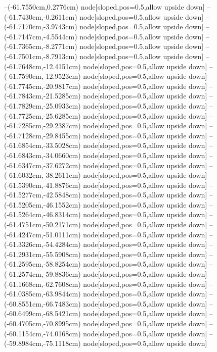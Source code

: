 --(-61.7550cm,0.2776cm) node[sloped,pos=0.5,allow upside down]{\ArrowIn}
--(-61.7430cm,-0.2611cm) node[sloped,pos=0.5,allow upside down]{\arrowIn}
--(-61.7170cm,-3.9743cm) node[sloped,pos=0.5,allow upside down]{\ArrowIn}
--(-61.7147cm,-4.5544cm) node[sloped,pos=0.5,allow upside down]{\arrowIn}
--(-61.7365cm,-8.2771cm) node[sloped,pos=0.5,allow upside down]{\ArrowIn}
--(-61.7501cm,-8.7913cm) node[sloped,pos=0.5,allow upside down]{\arrowIn}
--(-61.7648cm,-12.4151cm) node[sloped,pos=0.5,allow upside down]{\ArrowIn}
--(-61.7590cm,-12.9523cm) node[sloped,pos=0.5,allow upside down]{\arrowIn}
--(-61.7745cm,-20.9817cm) node[sloped,pos=0.5,allow upside down]{\ArrowIn}
--(-61.7843cm,-21.5285cm) node[sloped,pos=0.5,allow upside down]{\arrowIn}
--(-61.7829cm,-25.0933cm) node[sloped,pos=0.5,allow upside down]{\ArrowIn}
--(-61.7725cm,-25.6285cm) node[sloped,pos=0.5,allow upside down]{\arrowIn}
--(-61.7285cm,-29.2387cm) node[sloped,pos=0.5,allow upside down]{\ArrowIn}
--(-61.7128cm,-29.8455cm) node[sloped,pos=0.5,allow upside down]{\arrowIn}
--(-61.6854cm,-33.5028cm) node[sloped,pos=0.5,allow upside down]{\ArrowIn}
--(-61.6843cm,-34.0660cm) node[sloped,pos=0.5,allow upside down]{\arrowIn}
--(-61.6347cm,-37.6272cm) node[sloped,pos=0.5,allow upside down]{\ArrowIn}
--(-61.6032cm,-38.2611cm) node[sloped,pos=0.5,allow upside down]{\arrowIn}
--(-61.5390cm,-41.8876cm) node[sloped,pos=0.5,allow upside down]{\ArrowIn}
--(-61.5277cm,-42.5848cm) node[sloped,pos=0.5,allow upside down]{\arrowIn}
--(-61.5205cm,-46.1552cm) node[sloped,pos=0.5,allow upside down]{\ArrowIn}
--(-61.5264cm,-46.8314cm) node[sloped,pos=0.5,allow upside down]{\arrowIn}
--(-61.4751cm,-50.2171cm) node[sloped,pos=0.5,allow upside down]{\ArrowIn}
--(-61.4247cm,-51.0111cm) node[sloped,pos=0.5,allow upside down]{\arrowIn}
--(-61.3326cm,-54.4284cm) node[sloped,pos=0.5,allow upside down]{\ArrowIn}
--(-61.2931cm,-55.5908cm) node[sloped,pos=0.5,allow upside down]{\ArrowIn}
--(-61.2595cm,-58.8254cm) node[sloped,pos=0.5,allow upside down]{\ArrowIn}
--(-61.2574cm,-59.8836cm) node[sloped,pos=0.5,allow upside down]{\ArrowIn}
--(-61.1668cm,-62.7608cm) node[sloped,pos=0.5,allow upside down]{\ArrowIn}
--(-61.0385cm,-63.9844cm) node[sloped,pos=0.5,allow upside down]{\ArrowIn}
--(-60.8551cm,-66.7483cm) node[sloped,pos=0.5,allow upside down]{\ArrowIn}
--(-60.6499cm,-68.5421cm) node[sloped,pos=0.5,allow upside down]{\ArrowIn}
--(-60.4705cm,-70.8995cm) node[sloped,pos=0.5,allow upside down]{\ArrowIn}
--(-60.1154cm,-74.0168cm) node[sloped,pos=0.5,allow upside down]{\ArrowIn}
--(-59.8984cm,-75.1118cm) node[sloped,pos=0.5,allow upside down]{\ArrowIn}
